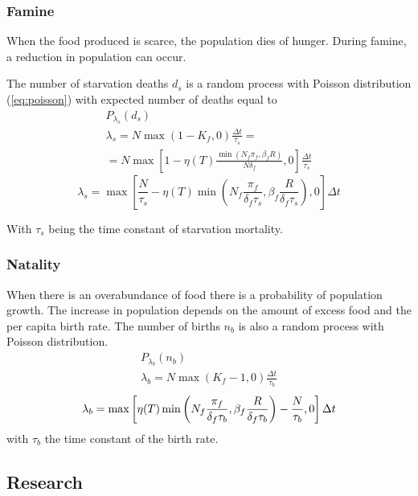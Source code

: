 \documentclass[a4paper,twoside]{article}
\begin{document}
\subsubsection{Famine}

When the food produced is scarce, the population dies of hunger. During famine, a reduction in population can occur.

The number of starvation deaths $ d_s $ is a random process with Poisson distribution (\ref{eq:poisson}) with expected number of deaths equal to
\begin{align*}
	P_{\lambda_s}(d_s)
	\\	
	\lambda_s = N \max(1 - K_f, 0) \frac{\Delta t}{\tau_s} =
	\\
	= N \max \left[ 1 - \eta(T) \frac{\min \left( N_f \pi_f,  \beta_f R \right)}{N \delta_f}, 0 \right] \frac{\Delta t}{\tau_s}
\end{align*}
\begin{equation}\label{eq:starv}
	\lambda_s = \max \left[ \frac{N}{\tau_s} - \eta(T) \min \left( N_f \frac{\pi_f}{\delta_f \tau_s}, \beta_f \frac{R}{\delta_f \tau_s} \right), 0 \right] \Delta t
\end{equation}

With $ \tau_s $ being the time constant of starvation mortality.

\subsubsection{Natality}

When there is an overabundance of food there is a probability of population growth. The increase in population depends on the amount of excess food and the per capita birth rate.
The number of births $ n_b $ is also a random process with Poisson distribution.
\begin{align*}
	P_{\lambda_b}(n_b)
	\\
	\lambda_b = N \max(K_f - 1, 0) \frac{\Delta t}{\tau_b}
\end{align*}
\begin{equation}{\label{eq:birth}}
	\lambda_b
	= \max \left[ \eta(T) \min \left( N_f \frac{\pi_f}{\delta_f \tau_b}, \beta_f \frac{R}{\delta_f \tau_b} \right) - \frac{N}{\tau_b}, 0 \right] \Delta t
\end{equation}
with $\tau_b$ the time constant of the birth rate.

\subsection{Research}
\end{document}
